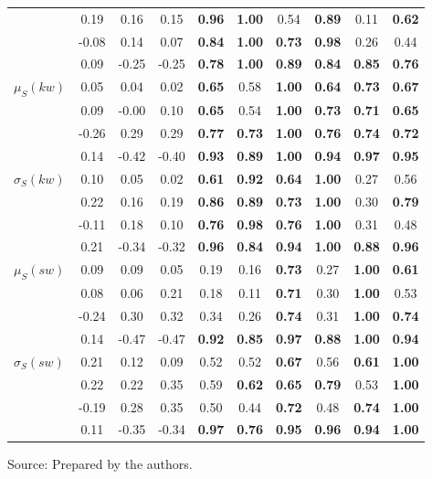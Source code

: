\begin{table*}[h!]
\begin{center}
\begin{tabular}{| l || c | c | c | c | c | c | c | c | c |}
 & 0.19 & 0.16 & 0.15 & {\bf 0.96} & {\bf 1.00} & 0.54 & {\bf 0.89} & 0.11 & {\bf 0.62} \\
 & -0.08 & 0.14 & 0.07 & {\bf 0.84} & {\bf 1.00} & {\bf 0.73} & {\bf 0.98} & 0.26 & 0.44 \\
 & 0.09 & -0.25 & -0.25 & {\bf 0.78} & {\bf 1.00} & {\bf 0.89} & {\bf 0.84} & {\bf 0.85} & {\bf 0.76} \\\hline
$\mu_S(kw)$ & 0.05 & 0.04 & 0.02 & {\bf 0.65} & 0.58 & {\bf 1.00} & {\bf 0.64} & {\bf 0.73} & {\bf 0.67} \\
 & 0.09 & -0.00 & 0.10 & {\bf 0.65} & 0.54 & {\bf 1.00} & {\bf 0.73} & {\bf 0.71} & {\bf 0.65} \\
 & -0.26 & 0.29 & 0.29 & {\bf 0.77} & {\bf 0.73} & {\bf 1.00} & {\bf 0.76} & {\bf 0.74} & {\bf 0.72} \\
 & 0.14 & -0.42 & -0.40 & {\bf 0.93} & {\bf 0.89} & {\bf 1.00} & {\bf 0.94} & {\bf 0.97} & {\bf 0.95} \\\hline
$\sigma_S(kw)$ & 0.10 & 0.05 & 0.02 & {\bf 0.61} & {\bf 0.92} & {\bf 0.64} & {\bf 1.00} & 0.27 & 0.56 \\
 & 0.22 & 0.16 & 0.19 & {\bf 0.86} & {\bf 0.89} & {\bf 0.73} & {\bf 1.00} & 0.30 & {\bf 0.79} \\
 & -0.11 & 0.18 & 0.10 & {\bf 0.76} & {\bf 0.98} & {\bf 0.76} & {\bf 1.00} & 0.31 & 0.48 \\
 & 0.21 & -0.34 & -0.32 & {\bf 0.96} & {\bf 0.84} & {\bf 0.94} & {\bf 1.00} & {\bf 0.88} & {\bf 0.96} \\\hline
$\mu_S(sw)$ & 0.09 & 0.09 & 0.05 & 0.19 & 0.16 & {\bf 0.73} & 0.27 & {\bf 1.00} & {\bf 0.61} \\
 & 0.08 & 0.06 & 0.21 & 0.18 & 0.11 & {\bf 0.71} & 0.30 & {\bf 1.00} & 0.53 \\
 & -0.24 & 0.30 & 0.32 & 0.34 & 0.26 & {\bf 0.74} & 0.31 & {\bf 1.00} & {\bf 0.74} \\
 & 0.14 & -0.47 & -0.47 & {\bf 0.92} & {\bf 0.85} & {\bf 0.97} & {\bf 0.88} & {\bf 1.00} & {\bf 0.94} \\\hline
$\sigma_S(sw)$ & 0.21 & 0.12 & 0.09 & 0.52 & 0.52 & {\bf 0.67} & 0.56 & {\bf 0.61} & {\bf 1.00} \\
 & 0.22 & 0.22 & 0.35 & 0.59 & {\bf 0.62} & {\bf 0.65} & {\bf 0.79} & 0.53 & {\bf 1.00} \\
 & -0.19 & 0.28 & 0.35 & 0.50 & 0.44 & {\bf 0.72} & 0.48 & {\bf 0.74} & {\bf 1.00} \\
 & 0.11 & -0.35 & -0.34 & {\bf 0.97} & {\bf 0.76} & {\bf 0.95} & {\bf 0.96} & {\bf 0.94} & {\bf 1.00} \\\hline
\end{tabular}
\begin{flushleft}
		Source: Prepared by the authors.\
\end{flushleft}
\end{center}
\end{table*}
